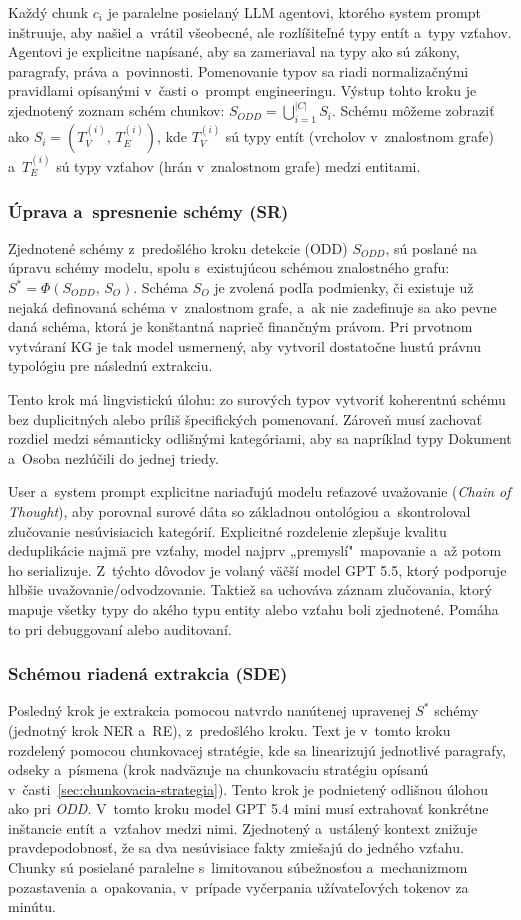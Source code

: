 Každý chunk $c_i$ je paralelne posielaný LLM agentovi, ktorého system prompt inštruuje, aby našiel a~vrátil všeobecné, ale rozlíšiteľné typy entít a~typy vzťahov. Agentovi je explicitne napísané, aby sa zameriaval na typy ako sú zákony, paragrafy, práva a~povinnosti. Pomenovanie typov sa riadi normalizačnými pravidlami opísanými v~časti o~prompt engineeringu. Výstup tohto kroku je zjednotený zoznam schém chunkov: $S_{ODD} = \bigcup_{i=1}^{|C|} S_i$. Schému môžeme zobraziť ako $S_i = (T^{(i)}_V, \, T^{(i)}_E)$, kde $T^{(i)}_V$ sú typy entít (vrcholov v~znalostnom grafe) a~$T^{(i)}_E$ sú typy vzťahov (hrán v~znalostnom grafe) medzi entitami.

\subsubsection{Úprava a~spresnenie schémy (SR)}
Zjednotené schémy z~predošlého kroku detekcie (ODD) $S_{ODD}$, sú poslané na úpravu schémy modelu, spolu s~existujúcou schémou znalostného grafu: $S^* = \Phi(S_{ODD},\, S_O)$. Schéma $S_{O}$ je zvolená podľa podmienky, či existuje už nejaká definovaná schéma v~znalostnom grafe, a~ak nie zadefinuje sa ako pevne daná schéma, ktorá je konštantná naprieč finančným právom. Pri prvotnom vytváraní KG je tak model usmernený, aby vytvoril dostatočne hustú právnu typológiu pre následnú extrakciu.

Tento krok má lingvistickú úlohu: zo surových typov vytvoriť koherentnú schému bez duplicitných alebo príliš špecifických pomenovaní. Zároveň musí zachovať rozdiel medzi sémanticky odlišnými kategóriami, aby sa napríklad typy Dokument a~Osoba nezlúčili do jednej triedy.

User a~system prompt explicitne nariaďujú modelu reťazové uvažovanie (\textit{Chain of Thought}), aby porovnal surové dáta so základnou ontológiou a~skontroloval zlučovanie nesúvisiacich kategórií. Explicitné rozdelenie zlepšuje kvalitu deduplikácie najmä pre vzťahy, model najprv „premyslí"\, mapovanie a~až potom ho serializuje. Z~týchto dôvodov je volaný väčší model GPT 5.5, ktorý podporuje hlbšie uvažovanie/odvodzovanie. Taktiež sa uchováva záznam zlučovania, ktorý mapuje všetky typy do akého typu entity alebo vzťahu boli zjednotené. Pomáha to pri debuggovaní alebo auditovaní.

\subsubsection{Schémou riadená extrakcia (SDE)}
Posledný krok je extrakcia pomocou natvrdo nanútenej upravenej $S^*$ schémy (jednotný krok NER a~RE), z~predošlého kroku. Text je v~tomto kroku rozdelený pomocou chunkovacej stratégie, kde sa linearizujú jednotlivé paragrafy, odseky a~písmena (krok nadväzuje na chunkovaciu stratégiu opísanú v~časti~\ref{sec:chunkovacia-strategia}). Tento krok je podnietený odlišnou úlohou ako pri \textit{ODD}. V~tomto kroku model GPT 5.4 mini musí extrahovať konkrétne inštancie entít a~vzťahov medzi nimi. Zjednotený a~ustálený kontext znižuje pravdepodobnosť, že sa dva nesúvisiace fakty zmiešajú do jedného vzťahu. Chunky sú posielané paralelne s~limitovanou súbežnosťou a~mechanizmom pozastavenia a~opakovania, v~prípade vyčerpania užívateľových tokenov za minútu.

